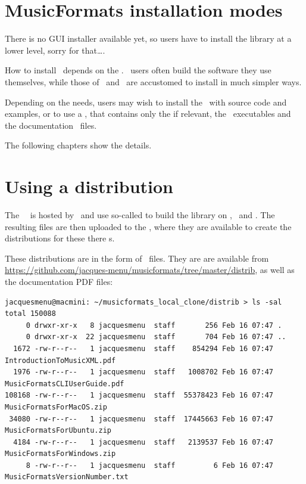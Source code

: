 
\chapter{MusicFormats installation modes}

There is no GUI installer available yet, so users have to install the library at a lower level, sorry for that\dots.

How to install \mf\ depends on the \OS. \Linux\ users often build the software they use themselves, while those of \Windows\ and \MacOS\ are accustomed to install in much simpler ways.

Depending on the needs, users may wish to install the  \mf\ with source code and examples, or to use a , that contains only the  if relevant, the \CLI\ executables and the documentation \pdf\ files.

The following chapters show the details.


\chapter{Using a distribution}

The \mf\ \repo\ is hosted by \github\ and use so-called  to build the library on \MacOS, \Ubuntu\ and \Windows. The resulting files are then uploaded to the \repo, where they are available to create the distributions for these there \OS s. 

These distributions are in the form of \zip\ files. They are are available from \url{https://github.com/jacques-menu/musicformats/tree/master/distrib}, as well as the documentation PDF files:
\begin{lstlisting}[language=Terminal]
jacquesmenu@macmini: ~/musicformats_local_clone/distrib > ls -sal
total 150088
     0 drwxr-xr-x   8 jacquesmenu  staff       256 Feb 16 07:47 .
     0 drwxr-xr-x  22 jacquesmenu  staff       704 Feb 16 07:47 ..
  1672 -rw-r--r--   1 jacquesmenu  staff    854294 Feb 16 07:47 IntroductionToMusicXML.pdf
  1976 -rw-r--r--   1 jacquesmenu  staff   1008702 Feb 16 07:47 MusicFormatsCLIUserGuide.pdf
108168 -rw-r--r--   1 jacquesmenu  staff  55378423 Feb 16 07:47 MusicFormatsForMacOS.zip
 34080 -rw-r--r--   1 jacquesmenu  staff  17445663 Feb 16 07:47 MusicFormatsForUbuntu.zip
  4184 -rw-r--r--   1 jacquesmenu  staff   2139537 Feb 16 07:47 MusicFormatsForWindows.zip
     8 -rw-r--r--   1 jacquesmenu  staff         6 Feb 16 07:47 MusicFormatsVersionNumber.txt
\end{lstlisting}

